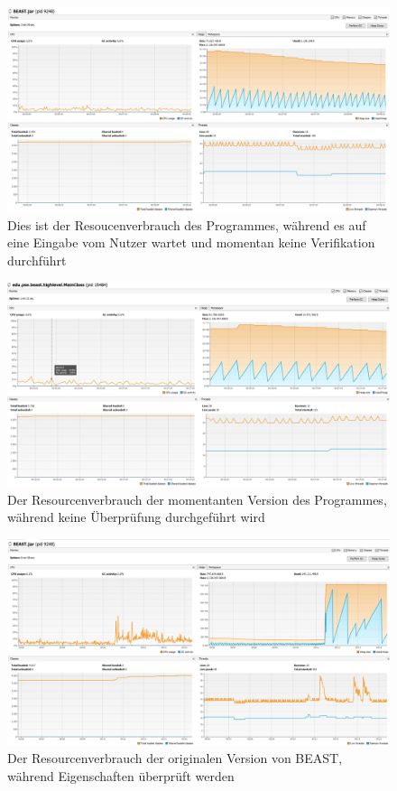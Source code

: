 ﻿\documentclass[a4paper]{scrreprt}
\begin{document}
\newpage
\begin{figure}[ht]
	\centering
  \includegraphics[width=1.0\textwidth,
  height=0.40\textwidth]{images/OLD_NO.png} \caption{Dies ist der
  Resoucenverbrauch des Programmes, während es auf eine Eingabe vom Nutzer wartet und momentan keine Verifikation durchführt}
	\label{fig1}
\end{figure}

\vspace{4cm}

\begin{figure}[ht]
	\centering
  \includegraphics[width=1.0\textwidth,
  height=0.40\textwidth]{images/NEW_NO.png} \caption{Der Resourcenverbrauch der
  momentanten Version des Programmes, während keine Überprüfung durchgeführt wird}
	\label{fig2}
\end{figure}


\newpage

\begin{figure}[ht]
	\centering
  \includegraphics[width=1.0\textwidth,
  height=0.4\textwidth]{images/OLD_YES.png} \caption{Der Resourcenverbrauch
 der originalen Version von BEAST, während Eigenschaften überprüft werden}
	\label{fig3}
\end{figure}
\end{document}
